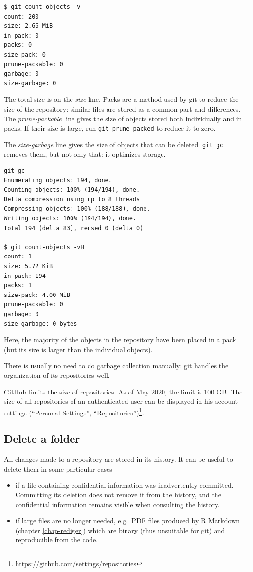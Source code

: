 \documentclass[
  12pt,
  american,
  a4paper,
  extrafontsizes,onecolumn,openright
  ]{memoir}
\providecommand{\tightlist}{%
  \setlength{\itemsep}{0pt}\setlength{\parskip}{0pt}}
\begin{document}
\begin{verbatim}
$ git count-objects -v
count: 200
size: 2.66 MiB
in-pack: 0
packs: 0
size-pack: 0
prune-packable: 0
garbage: 0
size-garbage: 0
\end{verbatim}

The total size is on the \emph{size} line.
Packs are a method used by git to reduce the size of the repository: similar files are stored as a common part and differences.
The \emph{prune-packable} line gives the size of objects stored both individually and in packs.
If their size is large, run \texttt{git\ prune-packed} to reduce it to zero.

The \emph{size-garbage} line gives the size of objects that can be deleted.
\texttt{git\ gc} removes them, but not only that: it optimizes storage.

\begin{verbatim}
git gc
Enumerating objects: 194, done.
Counting objects: 100% (194/194), done.
Delta compression using up to 8 threads
Compressing objects: 100% (188/188), done.
Writing objects: 100% (194/194), done.
Total 194 (delta 83), reused 0 (delta 0)

$ git count-objects -vH
count: 1
size: 5.72 KiB
in-pack: 194
packs: 1
size-pack: 4.00 MiB
prune-packable: 0
garbage: 0
size-garbage: 0 bytes
\end{verbatim}

Here, the majority of the objects in the repository have been placed in a pack (but its size is larger than the individual objects).

There is usually no need to do garbage collection manually: git handles the organization of its repositories well.

GitHub limits the size of repositories.
As of May 2020, the limit is 100 GB.
The size of all repositories of an authenticated user can be displayed in his account settings (\enquote{Personal Settings}, \enquote{Repositories})\footnote{\url{https://github.com/settings/repositories}}.

\subsection{Delete a folder}\label{delete-a-folder}

All changes made to a repository are stored in its history.
It can be useful to delete them in some particular cases

\begin{itemize}
\tightlist
\item
  if a file containing confidential information was inadvertently committed.
  Committing its deletion does not remove it from the history, and the confidential information remains visible when consulting the history.
\item
  if large files are no longer needed, e.g.~PDF files produced by R Markdown (chapter \ref{chap-rediger}) which are binary (thus unsuitable for git) and reproducible from the code.
\end{itemize}
\end{document}
